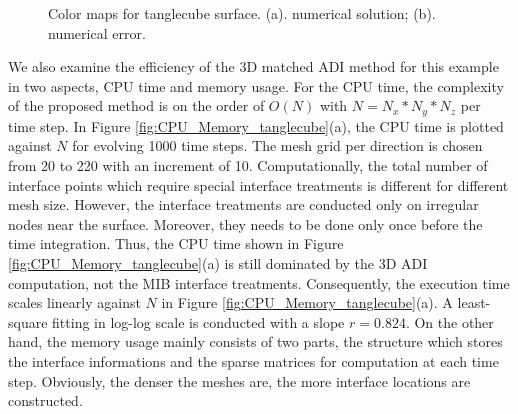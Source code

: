 \documentclass[dissertation]{uathesis}
\begin{document}
\begin{body}
\begin{flushleft}
\begin{figure}[!hb]
\begin{center}
	\end{center}
	\caption{Color maps for tanglecube surface. (a). numerical solution; (b). numerical error.}
	\label{fig:color_map_tanglecube}
\end{figure}
%
We also examine the efficiency of the 3D matched ADI method for this example in two aspects, CPU time and memory usage. For the CPU time, the complexity of the proposed method is on the order of $O(N)$ with $N=N_x*N_y*N_z$ per time step. In Figure \ref{fig:CPU_Memory_tanglecube}(a), the CPU time is plotted against $N$ for evolving 1000 time steps. The mesh grid per direction is chosen from 20 to 220 with an increment of 10. Computationally, the total number of interface points which require special interface treatments is different for different mesh size. However, the interface treatments are conducted only on irregular nodes near the surface. Moreover, they needs to be done only once before the time integration. Thus, the CPU time shown in Figure \ref{fig:CPU_Memory_tanglecube}(a) is still dominated by the 3D ADI computation, not the MIB interface treatments. Consequently, the execution time scales linearly against $N$ in Figure \ref{fig:CPU_Memory_tanglecube}(a). A least-square fitting in log-log scale is conducted with a slope $r=0.824$. On the other hand, the memory usage mainly consists of two parts, the structure which stores the interface informations and the sparse matrices for computation at each time step. Obviously, the denser the meshes are, the more interface locations are constructed. 

\end{flushleft}
\end{body}
\end{document}
